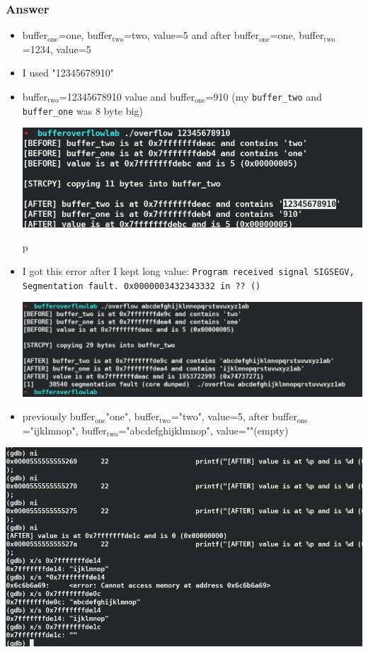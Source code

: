 \documentclass[11pt]{article}
\begin{document}
\subsubsection*{Answer}
\label{sec:org1315fe1}
\begin{itemize}
\item buffer\(_{\text{one}}\)=one, buffer\(_{\text{two}}\)=two, value=5 and after buffer\(_{\text{one}}\)=one, buffer\(_{\text{two}}\)=1234, value=5
\item I used "12345678910"
\item buffer\(_{\text{two}}\)=12345678910 value and buffer\(_{\text{one}}\)=910 (my \texttt{buffer\_two} and \texttt{buffer\_one} was 8 byte big)
\begin{center}
\includegraphics[width=.9\linewidth]{./bof_run.png}
\end{center}p
\item I got this error after I kept long value: \texttt{Program received signal SIGSEGV, Segmentation fault. 0x0000003432343332 in ?? ()}
\begin{center}
\includegraphics[width=.9\linewidth]{./bof_error.png}
\end{center}
\item previously buffer\(_{\text{one}}\)"one", buffer\(_{\text{two}}\)="two", value=5, after buffer\(_{\text{one}}\)="ijklmnop", buffer\(_{\text{two}}\)="abcdefghijklmnop", value=""(empty)
\end{itemize}
\begin{center}
\includegraphics[width=.9\linewidth]{./bof_one_two.png}
\end{center}
\end{document}
